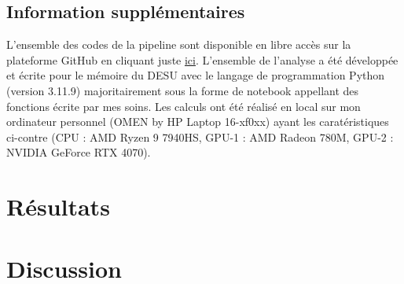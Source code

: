 \documentclass[11pt]{article}
\begin{document}
        \subsection*{Information supplémentaires}
            L'ensemble des codes de la pipeline sont disponible en libre accès sur la plateforme GitHub en cliquant juste \href{https://github.com/alexandre-laine/Pipeline_Elections_Legislatives}{ici}. L'ensemble de l'analyse a été développée et écrite pour le mémoire du DESU avec le langage de programmation Python (version 3.11.9) majoritairement sous la forme de notebook appellant des fonctions écrite par mes soins. Les calculs ont été réalisé en local sur mon ordinateur personnel (OMEN by HP Laptop 16-xf0xx) ayant les caratéristiques ci-contre (CPU : AMD Ryzen 9 7940HS, GPU-1 : AMD Radeon 780M, GPU-2 : NVIDIA GeForce RTX 4070).

    \newpage
    \section{Résultats}

    \newpage
    \section{Discussion}

    \printbibliography
\end{document}
